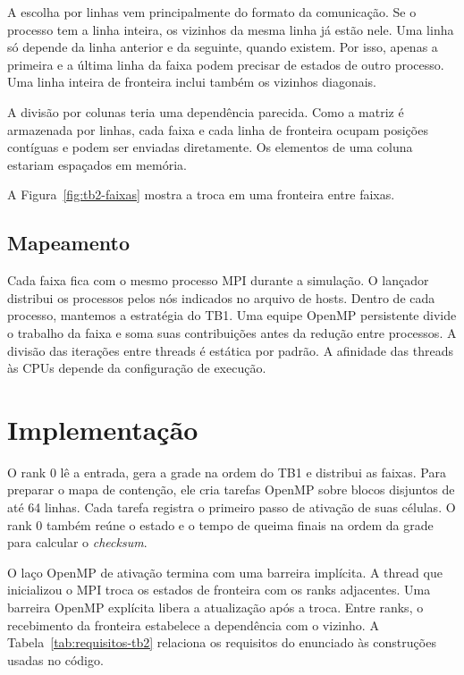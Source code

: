 \documentclass[12pt,a4paper]{article}
\begin{document}
A escolha por linhas vem principalmente do formato da comunicação. Se o processo tem a linha inteira, os vizinhos da mesma linha já estão nele. Uma linha só depende da linha anterior e da seguinte, quando existem. Por isso, apenas a primeira e a última linha da faixa podem precisar de estados de outro processo. Uma linha inteira de fronteira inclui também os vizinhos diagonais.

A divisão por colunas teria uma dependência parecida. Como a matriz é armazenada por linhas, cada faixa e cada linha de fronteira ocupam posições contíguas e podem ser enviadas diretamente. Os elementos de uma coluna estariam espaçados em memória.

A Figura~\ref{fig:tb2-faixas} mostra a troca em uma fronteira entre faixas.



\subsection{Mapeamento}

Cada faixa fica com o mesmo processo MPI durante a simulação. O lançador distribui os processos pelos nós indicados no arquivo de hosts. Dentro de cada processo, mantemos a estratégia do TB1. Uma equipe OpenMP persistente divide o trabalho da faixa e soma suas contribuições antes da redução entre processos. A divisão das iterações entre threads é estática por padrão. A afinidade das threads às CPUs depende da configuração de execução.

\section{Implementação}

O rank 0 lê a entrada, gera a grade na ordem do TB1 e distribui as faixas. Para preparar o mapa de contenção, ele cria tarefas OpenMP sobre blocos disjuntos de até 64 linhas. Cada tarefa registra o primeiro passo de ativação de suas células. O rank 0 também reúne o estado e o tempo de queima finais na ordem da grade para calcular o \textit{checksum}.

O laço OpenMP de ativação termina com uma barreira implícita. A thread que inicializou o MPI troca os estados de fronteira com os ranks adjacentes. Uma barreira OpenMP explícita libera a atualização após a troca. Entre ranks, o recebimento da fronteira estabelece a dependência com o vizinho. A Tabela~\ref{tab:requisitos-tb2} relaciona os requisitos do enunciado às construções usadas no código.
\end{document}
